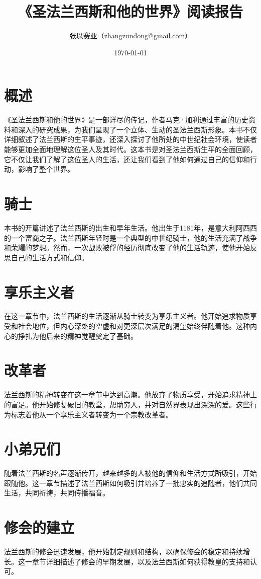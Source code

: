 \documentclass[12pt, a4paper]{ctexart}
\title{《圣法兰西斯和他的世界》阅读报告}
\author{张以赛亚（zhangzundong@gmail.com）}
\date{\today}
\begin{document}

\tableofcontents
\newpage
\section{概述}
《圣法兰西斯和他的世界》是一部详尽的传记，作者马克·加利通过丰富的历史资料和深入的研究成果，为我们呈现了一个立体、生动的圣法兰西斯形象。本书不仅详细叙述了法兰西斯的生平事迹，还深入探讨了他所处的中世纪社会环境，使读者能够更加全面地理解这位圣人及其时代。这本书是对圣法兰西斯生平的全面回顾，它不仅让我们了解了这位圣人的生活，还让我们看到了他如何通过自己的信仰和行动，影响了整个世界。
\section{骑士}
本书的开篇讲述了法兰西斯的出生和早年生活。他出生于1181年，是意大利阿西西的一个富商之子。法兰西斯年轻时是一个典型的中世纪骑士，他的生活充满了战争和荣耀的梦想。然而，一次战败被俘的经历彻底改变了他的生活轨迹，使他开始反思自己的生活方式和信仰。
\section{享乐主义者}
在这一章节中，法兰西斯的生活逐渐从骑士转变为享乐主义者。他开始追求物质享受和社会地位，但内心深处的空虚和对更深层次满足的渴望始终伴随着他。这种内心的挣扎为他后来的精神觉醒奠定了基础。
\section{改革者}
法兰西斯的精神转变在这一章节中达到高潮。他放弃了物质享受，开始追求精神上的富足。他开始修复破旧的教堂，帮助穷人，并对自然界表现出深深的爱。这些行为标志着他从一个享乐主义者转变为一个宗教改革者。
\section{小弟兄们}
随着法兰西斯的名声逐渐传开，越来越多的人被他的信仰和生活方式所吸引，开始跟随他。这一章节描述了法兰西斯如何吸引并培养了一批忠实的追随者，他们共同生活，共同祈祷，共同传播福音。
\section{修会的建立}
法兰西斯的修会迅速发展，他开始制定规则和结构，以确保修会的稳定和持续增长。这一章节详细描述了修会的早期发展，以及法兰西斯如何获得教皇的支持和认可。
\end{document}
